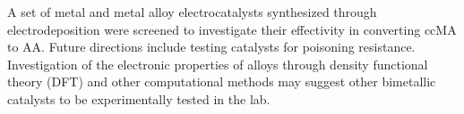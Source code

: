 {
A set of metal and metal alloy electrocatalysts synthesized through electrodeposition were screened to investigate their effectivity in converting ccMA to AA. Future directions include testing catalysts for poisoning resistance. Investigation of the electronic properties of alloys through density functional theory (DFT) and other computational methods may suggest other bimetallic catalysts to be experimentally tested in the lab.
}

\newpage
